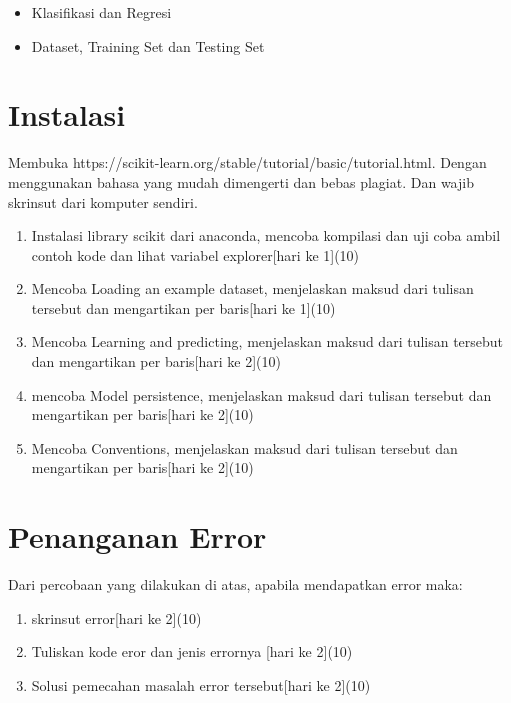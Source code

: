 \begin{enumerate}
\begin{itemize}
\item Klasifikasi dan Regresi
\item Dataset, Training Set dan Testing Set
\end{itemize}
\end{enumerate}

\section{Instalasi}
Membuka https://scikit-learn.org/stable/tutorial/basic/tutorial.html. Dengan menggunakan bahasa yang mudah dimengerti dan bebas plagiat. 
Dan wajib skrinsut dari komputer sendiri.
\begin{enumerate}
\item
Instalasi library scikit dari anaconda, mencoba kompilasi dan uji coba ambil contoh kode dan lihat variabel explorer[hari ke 1](10)
\item
Mencoba Loading an example dataset, menjelaskan maksud dari tulisan tersebut dan mengartikan per baris[hari ke 1](10)
\item
Mencoba Learning and predicting, menjelaskan maksud dari tulisan tersebut dan mengartikan per baris[hari ke 2](10)
\item
mencoba Model persistence, menjelaskan maksud dari tulisan tersebut dan mengartikan per baris[hari ke 2](10)
\item 
Mencoba Conventions, menjelaskan maksud dari tulisan tersebut dan mengartikan per baris[hari ke 2](10)
\end{enumerate}


\section{Penanganan Error}
Dari percobaan yang dilakukan di atas, apabila mendapatkan error maka:

\begin{enumerate}
	\item
	skrinsut error[hari ke 2](10)
	\item
Tuliskan kode eror dan jenis errornya [hari ke 2](10)
	\item
Solusi pemecahan masalah error tersebut[hari ke 2](10)

\end{enumerate}

